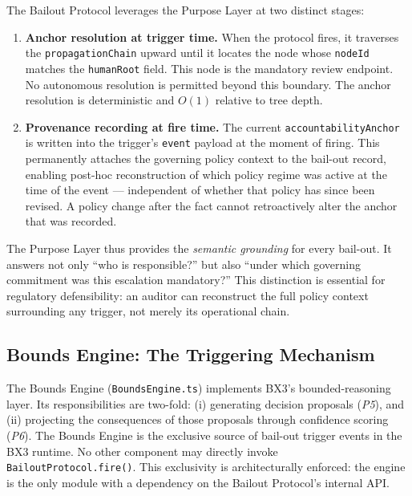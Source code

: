The Bailout Protocol leverages the Purpose Layer at two distinct stages:

\begin{enumerate}
  \item \textbf{Anchor resolution at trigger time.}  When the protocol fires, it
        traverses the \texttt{propagationChain} upward until it locates the node
        whose \texttt{nodeId} matches the \texttt{humanRoot} field.  This node is the
        mandatory review endpoint.  No autonomous resolution is permitted beyond this
        boundary.  The anchor resolution is deterministic and $O(1)$ relative to tree depth.

  \item \textbf{Provenance recording at fire time.}  The current
        \texttt{accountabilityAnchor} is written into the trigger's \texttt{event}
        payload at the moment of firing.  This permanently attaches the governing
        policy context to the bail-out record, enabling post-hoc reconstruction of
        which policy regime was active at the time of the event --- independent of
        whether that policy has since been revised.  A policy change after the fact
        cannot retroactively alter the anchor that was recorded.
\end{enumerate}

The Purpose Layer thus provides the \emph{semantic grounding} for every bail-out.
It answers not only ``who is responsible?'' but also ``under which governing
commitment was this escalation mandatory?''  This distinction is essential for
regulatory defensibility: an auditor can reconstruct the full policy context
surrounding any trigger, not merely its operational chain.

\subsection{Bounds Engine: The Triggering Mechanism}

The Bounds Engine (\texttt{BoundsEngine.ts}) implements BX3's bounded-reasoning
layer.  Its responsibilities are two-fold: (i) generating decision proposals
(\emph{P5}), and (ii) projecting the consequences of those proposals through
confidence scoring (\emph{P6}).  The Bounds Engine is the exclusive source of
bail-out trigger events in the BX3 runtime.  No other component may directly invoke
\texttt{BailoutProtocol.fire()}.  This exclusivity is architecturally enforced:
the engine is the only module with a dependency on the Bailout Protocol's internal API.

